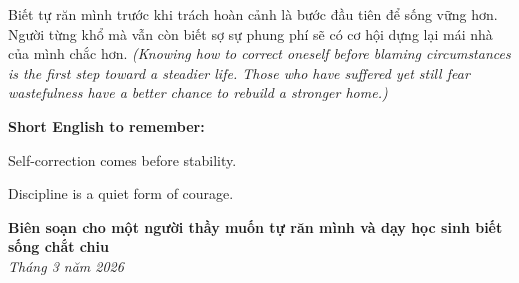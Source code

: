 \begin{baihoc}
Biết tự răn mình trước khi trách hoàn cảnh là bước đầu tiên để sống vững hơn. Người từng khổ mà vẫn còn biết sợ sự phung phí sẽ có cơ hội dựng lại mái nhà của mình chắc hơn.
\textit{(Knowing how to correct oneself before blaming circumstances is the first step toward a steadier life. Those who have suffered yet still fear wastefulness have a better chance to rebuild a stronger home.)}
\end{baihoc}

\begin{ghinhoanh}
\textbf{Short English to remember:}

Self-correction comes before stability.

Discipline is a quiet form of courage.
\end{ghinhoanh}

\begin{flushright}
\textbf{Biên soạn cho một người thầy muốn tự răn mình và dạy học sinh biết sống chắt chiu}\\
\textit{Tháng 3 năm 2026}
\end{flushright}

\ngancach
